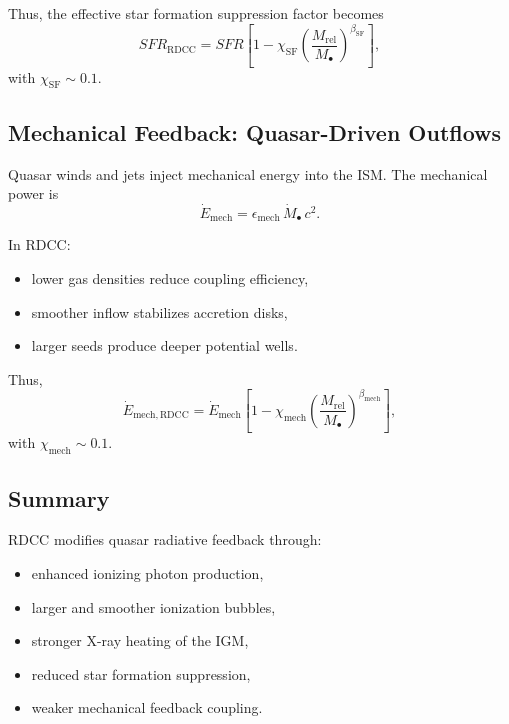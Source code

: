 \documentclass[11pt,a4paper]{article}
\begin{document}
Thus, the effective star formation suppression factor becomes
\begin{equation}
SFR_{\mathrm{RDCC}}
=
SFR
\left[
1
-
\chi_{\mathrm{SF}}
\left(
\frac{M_{\mathrm{rel}}}{M_{\bullet}}
\right)^{\beta_{\mathrm{SF}}}
\right],
\end{equation}
with $\chi_{\mathrm{SF}} \sim 0.1$.

\subsection{Mechanical Feedback: Quasar-Driven Outflows}

Quasar winds and jets inject mechanical energy into the ISM. The mechanical power is
\begin{equation}
\dot{E}_{\mathrm{mech}}
=
\epsilon_{\mathrm{mech}}\,
\dot{M}_{\bullet}\,c^{2}.
\end{equation}

In RDCC:
\begin{itemize}
\item lower gas densities reduce coupling efficiency,
\item smoother inflow stabilizes accretion disks,
\item larger seeds produce deeper potential wells.
\end{itemize}

Thus,
\begin{equation}
\dot{E}_{\mathrm{mech,RDCC}}
=
\dot{E}_{\mathrm{mech}}
\left[
1
-
\chi_{\mathrm{mech}}
\left(
\frac{M_{\mathrm{rel}}}{M_{\bullet}}
\right)^{\beta_{\mathrm{mech}}}
\right],
\end{equation}
with $\chi_{\mathrm{mech}} \sim 0.1$.

\subsection{Summary}

RDCC modifies quasar radiative feedback through:
\begin{itemize}
\item enhanced ionizing photon production,
\item larger and smoother ionization bubbles,
\item stronger X-ray heating of the IGM,
\item reduced star formation suppression,
\item weaker mechanical feedback coupling.
\end{itemize}
\end{document}
